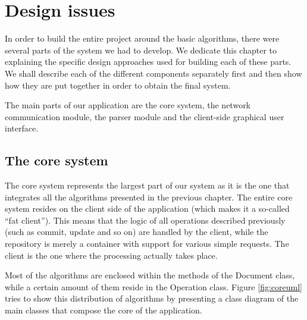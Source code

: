 \chapter{Design issues}

In order to build the entire project around the basic algorithms, there were several
parts of the system we had to develop. We dedicate this chapter to explaining the specific
design approaches used for building each of these parts. We shall describe each of the
different components separately first and then show how they are put together in order to
obtain the final system.

The main parts of our application are the core system, the network communication module,
the parser module and the client-side graphical user interface.

\section{The core system}

The core system represents the largest part of our system as it is the one that integrates
all the algorithms presented in the previous chapter. The entire core system resides on the
client side of the application (which makes it a so-called ``fat client''). This means that
the logic of all operations described previously (such as commit, update and so on) are
handled by the client, while the repository is merely a container with support for various
simple requests. The client is the one where the processing actually takes place.

Most of the algorithms are enclosed within the methods of the Document class, while a
certain amount of them reside in the Operation class. Figure \ref{fig:coreuml} tries to
show this distribution of algorithms by presenting a class diagram of the main classes
that compose the core of the application.

